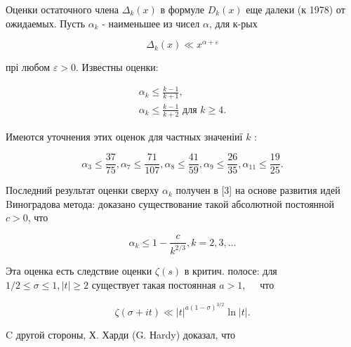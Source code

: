 \documentclass[10pt]{article}
\begin{document}
Оценки остаточного члена $\Delta_{k}(x)$ в формуле $D_{k}(x)$ еще далеки (к 1978) от ожидаемых. Пусть $\alpha_{k}$ - наименьшее из чисел $\alpha$, для к-рых



\[

\Delta_{k}(x) \ll x^{\alpha+\varepsilon}

\]



прі любом $\varepsilon>0$. Известны оценки:



\[

\begin{gathered}

\alpha_{k} \leqslant \frac{k-1}{k+1}, \\

\alpha_{k} \leqslant \frac{k-1}{k+2} \text { для } k \geqslant 4 .

\end{gathered}

\]



Имеются уточнения этих оценок для частных значеніиї $k$ :



\[

\alpha_{3} \leqslant \frac{37}{75}, \alpha_{7} \leqslant \frac{71}{107}, \alpha_{8} \leqslant \frac{41}{59}, \alpha_{9} \leqslant \frac{26}{35}, \alpha_{11} \leqslant \frac{19}{25} .

\]



Последний результат оценки сверху $\alpha_{k}$ получен в [3] на основе развития идей Bиноградова метода: доказано существование такой абсолютной постоянной $c>0$, что



\[

\alpha_{k} \leqslant 1-\frac{c}{k^{2 / 3}}, k=2,3, \ldots

\]



Эта оценка есть следствие оценки $\zeta(s)$ в критич. полосе: для $1 / 2 \leqslant \sigma \leqslant 1,|t| \geqslant 2$ существует такая постоянная $a>1, \quad$ что



\[

\zeta(\sigma+i t) \ll|t|^{a(1-\sigma)^{3 / 2}} \ln |t| .

\]



C другой стороны, Х. Харди (G. Нardy) доказал, что
\end{document}
